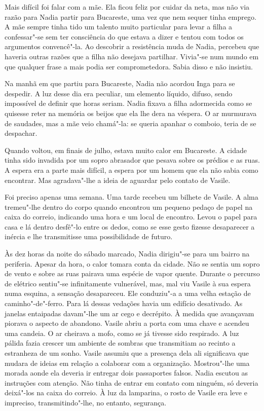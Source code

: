 Mais difícil foi falar com a mãe. Ela ficou feliz por cuidar da neta,
mas não via razão para Nadia partir para
Bucareste, uma vez que nem sequer tinha emprego. A mãe sempre tinha tido
um talento muito particular para levar a filha a confessar"-se sem ter
consciência do que estava a dizer e tentou com todos os argumentos
convencê"-la. Ao descobrir a resistência muda de Nadia, percebeu que
haveria outras razões que a filha não desejava partilhar. Vivia"-se num mundo em que qualquer frase a mais podia ser comprometedora.
Sabia disso e não insistiu.

Na manhã em que partiu para Bucareste, Nadia não acordou Inga para se
despedir. A luz desse dia era peculiar, um elemento líquido, difuso,
sendo impossível de definir que horas seriam. Nadia fixava a filha
adormecida como se quisesse reter na memória os beijos que ela lhe dera
na véspera. O ar murmurava de saudades, mas a mãe veio chamá"-la: se
queria apanhar o comboio, teria de se despachar.

\bigskip

Quando voltou, em finais de julho, estava muito calor em Bucareste. A
cidade tinha sido invadida por um sopro abrasador que pesava sobre os
prédios e as ruas. A espera era a parte mais difícil, a espera por um
homem que ela não sabia como encontrar. Mas agradava"-lhe a ideia de
aguardar pelo contato de Vasile.

Foi preciso apenas uma semana. Uma tarde recebeu um bilhete de Vasile. A
alma tremeu"-lhe dentro do corpo quando encontrou um pequeno pedaço de
papel na caixa do correio, indicando uma hora e um local de encontro.
Levou o papel para casa e lá dentro desfê"-lo entre os dedos, como se
esse gesto fizesse desaparecer a inércia e lhe transmitisse uma
possibilidade de futuro.

Às dez horas da noite do sábado marcado, Nadia dirigiu"-se para um
bairro na periferia. Apesar da hora, o calor tomara conta da cidade. Não
se sentia um sopro de vento e sobre as ruas pairava uma espécie de vapor
quente. Durante o percurso de elétrico sentiu"-se infinitamente
vulnerável, mas, mal viu Vasile à sua espera numa esquina, a sensação
desapareceu. Ele conduziu"-a a uma velha estação de caminho"-de"-ferro.
Para lá dessas vedações havia um edifício desativado. As janelas
entaipadas davam"-lhe um ar cego e decrépito. À medida que avançavam
piorava o aspecto de abandono. Vasile abriu a porta com uma chave e
acendeu uma candeia. O ar cheirava a mofo, como se já tivesse sido
respirado. A luz pálida fazia crescer um ambiente de sombras que
transmitiam ao recinto a estranheza de um sonho. Vasile assumiu que a
presença dela ali significava que mudara de ideias em relação a
colaborar com a organização. Mostrou"-lhe uma morada aonde ela deveria ir
entregar dois passaportes falsos. Nadia escutou as instruções com
atenção. Não tinha de entrar em contato com ninguém, só deveria
deixá"-los na caixa do correio. À luz da lamparina, o rosto de Vasile era
leve e impreciso, transmitindo"-lhe, no entanto, segurança.


